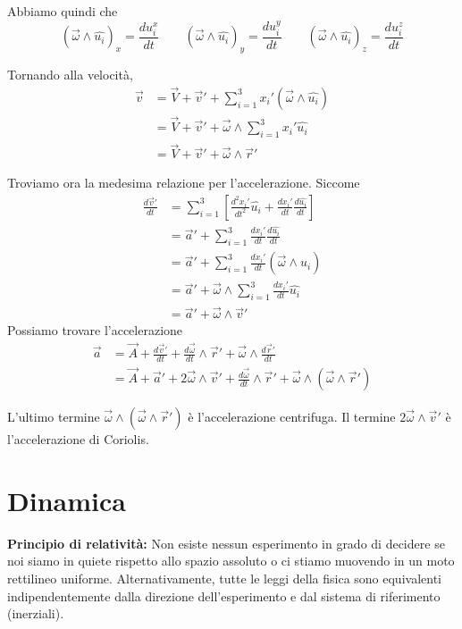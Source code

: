 \documentclass[a4paper]{article}
\begin{document}
Abbiamo quindi che
\[
    (\vec{\omega} \wedge \hat{u_i})_x = \frac{du_i^x}{dt}
    \qquad
    (\vec{\omega} \wedge \hat{u_i})_y = \frac{du_i^y}{dt}
    \qquad
    (\vec{\omega} \wedge \hat{u_i})_z = \frac{du_i^z}{dt}
\]

Tornando alla velocità,
\begin{align*}
    \vec{v} &= \vec{V} + \vec{v}' + \sum_{i=1}^3 x_i' (\vec{\omega} \wedge \hat{u_i}) \\
    &= \vec{V} + \vec{v}' + \vec{\omega} \wedge \sum_{i=1}^3 x_i' \hat{u_i} \\
    &= \vec{V} + \vec{v}' + \vec{\omega} \wedge \vec{r}'
\end{align*}

Troviamo ora la medesima relazione per l'accelerazione.
Siccome
\begin{align*}
    \frac{d\vec{v}'}{dt} &= \sum_{i=1}^3 \left[
        \frac{d^2 x_i'}{dt^2} \hat{u_i} + \frac{dx_i'}{dt} \frac{d\hat{u_i}}{dt}
    \right] \\
    &= \vec{a}' + \sum_{i=1}^3 \frac{dx_i'}{dt} \frac{d\hat{u_i}}{dt} \\
    &= \vec{a}' + \sum_{i=1}^3 \frac{dx_i'}{dt} (\vec{\omega} \wedge \hat{u_i}) \\
    &= \vec{a}' + \vec{\omega} \wedge \sum_{i=1}^3 \frac{dx_i'}{dt} \hat{u_i} \\
    &= \vec{a}' + \vec{\omega} \wedge \vec{v}'
\end{align*}
Possiamo trovare l'accelerazione
\begin{align*}
    \vec{a} &= \vec{A} + \frac{d\vec{v}'}{dt} + \frac{d\vec{\omega}}{dt} \wedge \vec{r}'
    + \vec{\omega} \wedge \frac{d\vec{r}'}{dt} \\
    &= \vec{A} + \vec{a}' + 2 \vec{\omega} \wedge \vec{v}' + \frac{d\vec{\omega}}{dt} \wedge \vec{r}'
    + \vec{\omega} \wedge (\vec{\omega} \wedge \vec{r}')
\end{align*}

L'ultimo termine \(\vec{\omega} \wedge (\vec{\omega} \wedge \vec{r}')\) è l'accelerazione centrifuga.
Il termine \(2 \vec{\omega} \wedge \vec{v}'\) è l'accelerazione di Coriolis.

\pagebreak

\section{Dinamica}

\textbf{Principio di relatività:}
Non esiste nessun esperimento in grado di decidere se noi siamo in quiete rispetto allo spazio assoluto
o ci stiamo muovendo in un moto rettilineo uniforme. Alternativamente, tutte le leggi della fisica sono equivalenti
indipendentemente dalla direzione dell'esperimento e dal sistema di riferimento (inerziali).
\end{document}
